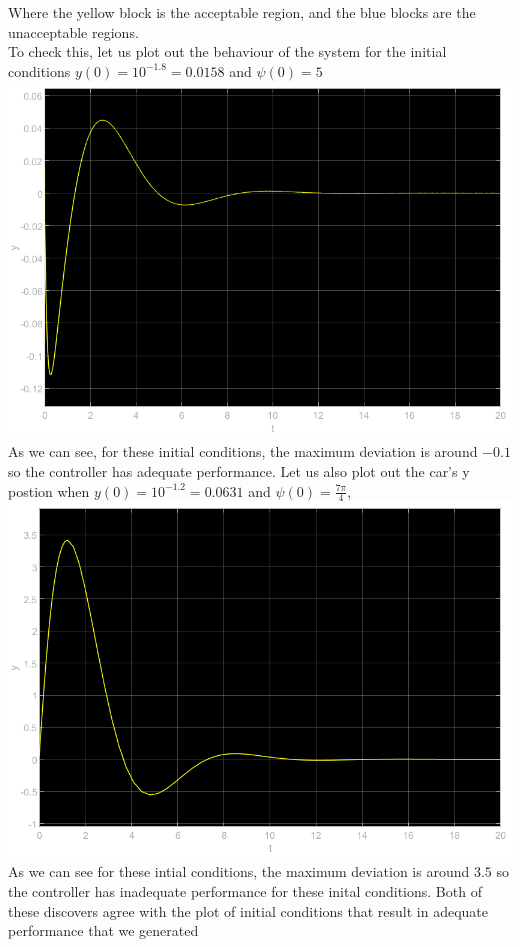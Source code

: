 \documentclass[12pt]{article}
\begin{document}
Where the yellow block is the acceptable region, and the blue blocks are the unacceptable regions.\\
To check this, let us plot out the behaviour of the system for the initial conditions $y(0)=10^{-1.8}=0.0158$ and $\psi(0)=5$\\
\includegraphics[scale=0.4]{Problem3Fig2.png}\\
As we can see, for these initial conditions, the maximum deviation is around $-0.1$ so the controller has adequate performance. Let us also plot out the car's y postion when
$y(0)=10^{-1.2}=0.0631$ and $\psi(0)=\frac{7\pi}{4}$,
\\\includegraphics[scale=0.4]{Problem3Fig3.png}\\
As we can see for these intial conditions, the maximum deviation is around $3.5$ so the controller has inadequate performance for these inital conditions. Both of these discovers agree with the plot of initial conditions
that result in adequate performance that we generated
\end{document}
